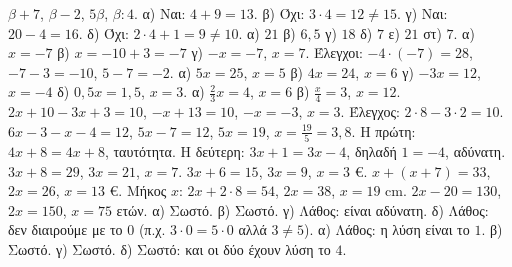  $\beta+7$, \quad $\beta-2$, \quad $5\beta$, \quad $\beta:4$.
 α) Ναι: $4+9=13$. β) Όχι: $3\cdot4=12\neq15$. γ) Ναι: $20-4=16$. δ) Όχι: $2\cdot4+1=9\neq10$.
 α) $21$ \quad β) $6{,}5$ \quad γ) $18$ \quad δ) $7$ \quad ε) $21$ \quad στ) $7$.
 α) $x=-7$ \quad β) $x=-10+3=-7$ \quad γ) $-x=-7$, $x=7$. Έλεγχοι: $-4\cdot(-7)=28$, $-7-3=-10$, $5-7=-2$.
 α) $5x=25$, $x=5$ \quad β) $4x=24$, $x=6$ \quad γ) $-3x=12$, $x=-4$ \quad δ) $0{,}5x=1{,}5$, $x=3$.
 α) $\frac{2}{3}x=4$, $x=6$ \quad β) $\frac{x}{4}=3$, $x=12$.
 $2x+10-3x+3=10$, $-x+13=10$, $-x=-3$, $x=3$. Έλεγχος: $2\cdot8-3\cdot2=10$.
 $6x-3-x-4=12$, $5x-7=12$, $5x=19$, $x=\frac{19}{5}=3{,}8$.
 Η πρώτη: $4x+8=4x+8$, ταυτότητα. Η δεύτερη: $3x+1=3x-4$, δηλαδή $1=-4$, αδύνατη.
 $3x+8=29$, $3x=21$, $x=7$.
 $3x+6=15$, $3x=9$, $x=3$ €.
 $x+(x+7)=33$, $2x=26$, $x=13$ €.
 Μήκος $x$: $2x+2\cdot8=54$, $2x=38$, $x=19$ cm.
 $2x-20=130$, $2x=150$, $x=75$ ετών.
 α) Σωστό. \quad β) Σωστό. \quad γ) Λάθος: είναι αδύνατη. \quad δ) Λάθος: δεν διαιρούμε με το $0$ (π.χ. $3\cdot0=5\cdot0$ αλλά $3\neq5$).
 α) Λάθος: η λύση είναι το $1$. \quad β) Σωστό. \quad γ) Σωστό. \quad δ) Σωστό: και οι δύο έχουν λύση το $4$.
